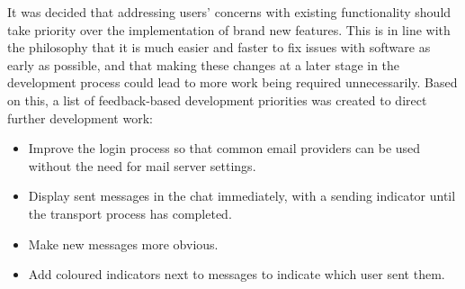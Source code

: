 It was decided that addressing users' concerns with existing functionality should take priority over the implementation of brand new features. This is in line with the philosophy that it is much easier and faster to fix issues with software as early as possible, and that making these changes at a later stage in the development process could lead to more work being required unnecessarily. Based on this, a list of feedback-based development priorities was created to direct further development work:

\begin{itemize}
  \item Improve the login process so that common email providers can be used without the need for mail server settings.
  \item Display sent messages in the chat immediately, with a sending indicator until the transport process has completed.
  \item Make new messages more obvious.
  \item Add coloured indicators next to messages to indicate which user sent them.
\end{itemize}